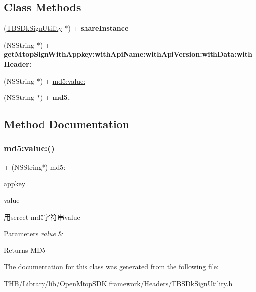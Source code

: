\subsection*{Class Methods}
\begin{DoxyCompactItemize}
\item 
\mbox{\label{interface_t_b_s_dk_sign_utility_a403c2af692a0eb467737dcd4dbef058b}} 
(\mbox{\hyperlink{interface_t_b_s_dk_sign_utility}{T\+B\+S\+Dk\+Sign\+Utility}} $\ast$) + {\bfseries share\+Instance}
\item 
\mbox{\label{interface_t_b_s_dk_sign_utility_a1630eeabc59308ba8506c7b405eb0431}} 
(N\+S\+String $\ast$) + {\bfseries get\+Mtop\+Sign\+With\+Appkey\+:with\+Api\+Name\+:with\+Api\+Version\+:with\+Data\+:with\+Header\+:}
\item 
(N\+S\+String $\ast$) + \mbox{\hyperlink{interface_t_b_s_dk_sign_utility_a163ff3994321261b636a24479cd23473}{md5\+:value\+:}}
\item 
\mbox{\label{interface_t_b_s_dk_sign_utility_a11b2b04760a69bd5ad6174d33e5ff348}} 
(N\+S\+String $\ast$) + {\bfseries md5\+:}
\end{DoxyCompactItemize}


\subsection{Method Documentation}
\mbox{\label{interface_t_b_s_dk_sign_utility_a163ff3994321261b636a24479cd23473}} 
\subsubsection{\texorpdfstring{md5\+:value\+:()}{md5:value:()}}
{\footnotesize\ttfamily + (N\+S\+String$\ast$) md5\+: \begin{DoxyParamCaption}\item[{(N\+S\+String $\ast$)}]{appkey }\item[{value:(N\+S\+String $\ast$)}]{value }\end{DoxyParamCaption}}

用sercet md5字符串value 
\begin{DoxyParams}{Parameters}
{\em value} & \\
\hline
\end{DoxyParams}
\begin{DoxyReturn}{Returns}
M\+D5 
\end{DoxyReturn}


The documentation for this class was generated from the following file\+:\begin{DoxyCompactItemize}
\item 
T\+H\+B/\+Library/lib/\+Open\+Mtop\+S\+D\+K.\+framework/\+Headers/T\+B\+S\+Dk\+Sign\+Utility.\+h\end{DoxyCompactItemize}

